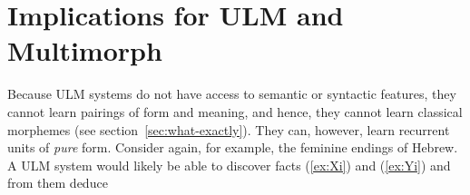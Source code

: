 



\section{Implications for \ac{ULM}  and Multimorph}

Because \ac{ULM} systems do not have access to
semantic or syntactic features, they cannot learn pairings of form and meaning, 
and hence, they cannot learn classical morphemes (see section~\ref{sec:what-exactly}). 
They can, however, learn recurrent units of \emph{pure} form. 
Consider again, 
for example, the feminine endings of Hebrew. A \ac{ULM} system would likely be 
able to discover facts (\ref{ex:Xi}) and (\ref{ex:Yi}) and from them deduce 

